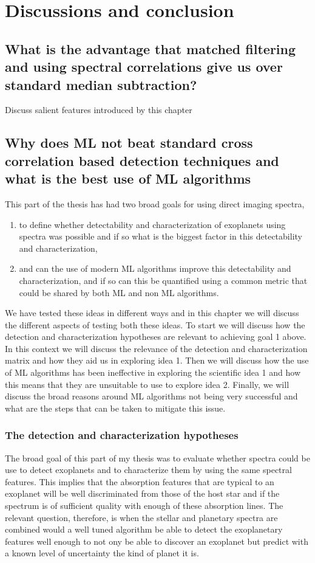 \part{Discussions and conclusion}
\startcontents[chapters]
\printmyminitoc{}
\chapter{What is the advantage that matched filtering and using spectral correlations give us over standard median subtraction?}
Discuss salient features introduced by this chapter
\chapter{Why does ML not beat standard cross correlation based detection techniques and what is the best use of ML algorithms}
This part of the thesis has had two broad goals for using direct imaging spectra,
\begin{enumerate}
    \item to define whether detectability and characterization of exoplanets using spectra was possible and if so what is the biggest factor in this detectability and characterization,
    \item and can the use of modern ML algorithms improve this detectability and characterization, and if so can this be quantified using a common metric that could be shared by both ML and non ML algorithms.
\end{enumerate}
We have tested these ideas in different ways and in this chapter we will discuss the different aspects of testing both these ideas.
To start we will discuss how the detection and characterization hypotheses are relevant to achieving goal 1 above.
In this context we will discuss the relevance of the detection and characterization matrix and how they aid us in exploring idea 1.
Then we will discuss how the use of ML algorithms has been ineffective in exploring the scientific idea 1 and how this means that they are unsuitable to use to explore idea 2.
Finally, we will discuss the broad reasons around ML algorithms not being very successful and what are the steps that can be taken to mitigate this issue.
\section{The detection and characterization hypotheses}
The broad goal of this part of my thesis was to evaluate whether spectra could be use to detect exoplanets and to characterize them by using the same spectral features.
This implies that the absorption features that are typical to an exoplanet will be well discriminated from those of the host star and if the spectrum is of sufficient quality with enough of these absorption lines.
The relevant question, therefore, is when the stellar and planetary spectra are combined would a well tuned algorithm be able to detect the exoplanetary features well enough to not ony be able to discover an exoplanet but predict with a known level of uncertainty the kind of planet it is.

